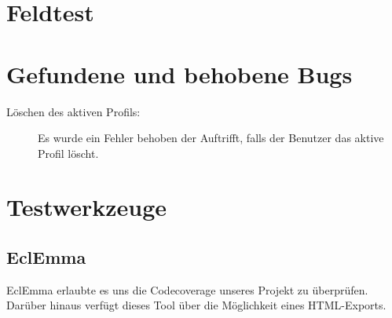 \documentclass[parskip=full]{scrreprt}
\begin{document}
\chapter{Feldtest}

\chapter{Gefundene und behobene Bugs}

\begin{description}
	\item[Löschen des aktiven Profils:] Es wurde ein Fehler behoben der Auftrifft, falls der Benutzer das aktive Profil löscht.
\end{description}

\chapter{Testwerkzeuge}

\section{EclEmma}

EclEmma erlaubte es uns die Codecoverage unseres Projekt zu überprüfen. Darüber hinaus verfügt dieses Tool über die Möglichkeit eines HTML-Exports.
\end{document}
